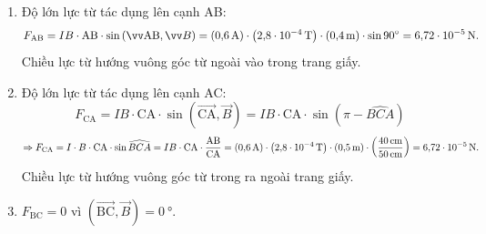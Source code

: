 \begin{vd}
{\begin{center}
		\end{center}	
		\begin{enumerate}[label=\alph*)]
			\item Độ lớn lực từ tác dụng lên cạnh AB:
			$$F_\text{AB}=IB\cdot\text{AB}\cdot\sin\left(\overrightarrow{\text{AB}},\vec{B}\right)=\left(\SI{0.6}{\ampere}\right)\cdot\left(\SI{2.8E-4}{\tesla}\right)\cdot\left(\SI{0.4}{\meter}\right)\cdot\sin\SI{90}{\degree}=\SI{6.72E-5}{\newton}.$$
			Chiều lực từ hướng vuông góc từ ngoài vào trong trang giấy.
			\item Độ lớn lực từ tác dụng lên cạnh AC:
			$$F_\text{CA}=IB\cdot\text{CA}\cdot\sin\left(\overrightarrow{\text{CA}},\vec{B}\right)=IB\cdot\text{CA}\cdot\sin\left(\pi -\widehat{BCA}\right)$$
			$$\Rightarrow F_\text{CA}=I\cdot B\cdot\text{CA}\cdot\sin\widehat{BCA}=IB\cdot\text{CA}\cdot\dfrac{\text{AB}}{\text{CA}}=\left(\SI{0.6}{\ampere}\right)\cdot\left(\SI{2.8E-4}{\tesla}\right)\cdot\left(\SI{0.5}{\meter}\right)\cdot\left(\dfrac{\SI{40}{\centi\meter}}{\SI{50}{\centi\meter}}\right)=\SI{6.72E-5}{\newton}.$$
			Chiều lực từ hướng vuông góc từ trong ra ngoài trang giấy.
			\item $F_\text{BC}=0$ vì $\left(\overrightarrow{\text{BC}},\vec{B}\right)=\SI{0}{\degree}$.
		\end{enumerate}
	}
\end{vd}

